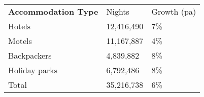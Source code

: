 \begin{tabular}[t]{p{4.8cm}>{\hfill}p{1.3cm}>{\hfill}p{1.4cm}}
 \textbf{Accommodation Type} & Nights & Growth (pa) \\ 
 Hotels & 12,416,490 & 7\% \\ 
  Motels & 11,167,887 & 4\% \\ 
  Backpackers &  4,839,882 & 8\% \\ 
  Holiday parks &  6,792,486 & 8\% \\ 
  Total & 35,216,738 & 6\% \\ 
  \end{tabular}
